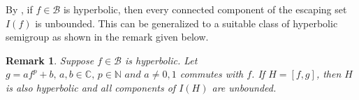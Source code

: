 \documentclass[a4paper,12pt]{amsart}
\numberwithin{equation}{section}
\newtheorem{remark}[theorem]{Remark}
\newtheorem{definition}[theorem]{Definition}
\begin{document}
	By \cite[Theorem~1.1]{rempequestion}, if $f \in \mathcal{B}$ is hyperbolic, then every connected component of the escaping set $I(f)$ is unbounded. This can be generalized to a suitable class of hyperbolic semigroup as shown in the remark given below.
\begin{remark}
	Suppose $f \in \mathcal{B}$ is hyperbolic. Let $g = af^p + b,\, a,b \in \mathbb{C},\, p \in \mathbb{N} \, \, and \,\, a \neq 0,1$ commutes with $f$. If $H = [f,g]$, then $H$ is also hyperbolic and all components of $I(H)$ are unbounded.
\end{remark}
\end{document}
